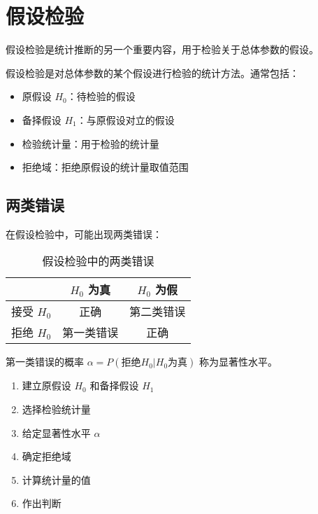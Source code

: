 \section{假设检验}\label{sec:hypothesis-testing}

假设检验是统计推断的另一个重要内容，用于检验关于总体参数的假设。

\begin{definition}[假设检验]\label{def:hypothesis-testing}
假设检验是对总体参数的某个假设进行检验的统计方法。通常包括：
\begin{itemize}
    \item 原假设 $H_0$：待检验的假设
    \item 备择假设 $H_1$：与原假设对立的假设
    \item 检验统计量：用于检验的统计量
    \item 拒绝域：拒绝原假设的统计量取值范围
\end{itemize}
\end{definition}

\subsection{两类错误}

在假设检验中，可能出现两类错误：

\begin{table}[htbp]
    \centering
    \caption{假设检验中的两类错误}
    \label{tab:type-errors}
    \begin{tabular}{@{}ccc@{}}
        \toprule
        & $H_0$ 为真 & $H_0$ 为假 \\
        \midrule
        接受 $H_0$ & 正确 & 第二类错误 \\
        拒绝 $H_0$ & 第一类错误 & 正确 \\
        \bottomrule
    \end{tabular}
\end{table}

\begin{definition}[显著性水平]\label{def:significance-level}
第一类错误的概率 $\alpha = P(\text{拒绝} H_0 | H_0 \text{为真})$ 称为显著性水平。
\end{definition}

\begin{successbox}[title=假设检验的步骤]
\begin{enumerate}
    \item 建立原假设 $H_0$ 和备择假设 $H_1$
    \item 选择检验统计量
    \item 给定显著性水平 $\alpha$
    \item 确定拒绝域
    \item 计算统计量的值
    \item 作出判断
\end{enumerate}
\end{successbox}

